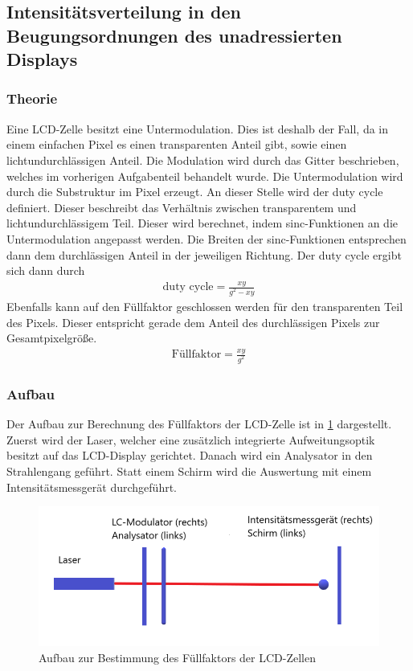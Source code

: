 \subsection{Intensitätsverteilung in den Beugungsordnungen des unadressierten Displays}
\subsubsection{Theorie}
Eine LCD-Zelle besitzt eine Untermodulation. Dies ist deshalb der Fall, da in einem einfachen Pixel es einen transparenten Anteil gibt, sowie einen lichtundurchlässigen Anteil. Die Modulation wird durch das Gitter beschrieben, welches im vorherigen Aufgabenteil behandelt wurde. Die Untermodulation wird durch die Substruktur im Pixel erzeugt. An dieser Stelle wird der duty cycle definiert. Dieser beschreibt das Verhältnis zwischen transparentem und lichtundurchlässigem Teil. 
Dieser wird berechnet, indem sinc-Funktionen an die Untermodulation angepasst werden. Die Breiten der sinc-Funktionen entsprechen dann dem durchlässigen Anteil in der jeweiligen Richtung. 
Der duty cycle ergibt sich dann durch
\begin{align}
	\text{duty cycle} = \frac{xy}{g^{2}-xy}
	\label{dutycyc}
\end{align}
Ebenfalls kann auf den Füllfaktor geschlossen werden für den transparenten Teil des Pixels. Dieser entspricht gerade dem Anteil des durchlässigen Pixels zur Gesamtpixelgröße.
\begin{align}
	\text{Füllfaktor} = \frac{xy}{g^{2}}
	\label{ff}
\end{align}

\subsubsection{Aufbau}
Der Aufbau zur Berechnung des Füllfaktors der LCD-Zelle ist in \cref{422} dargestellt. Zuerst wird der Laser, welcher eine zusätzlich integrierte Aufweitungsoptik besitzt auf das LCD-Display gerichtet. Danach wird ein Analysator in den Strahlengang geführt. Statt einem Schirm wird die Auswertung mit einem Intensitätsmessgerät durchgeführt.
\begin{figure}[h!]
	\centering
	\includegraphics[scale = 1]{4.2.2-Aufbau.png}
	\caption{Aufbau zur Bestimmung des Füllfaktors der LCD-Zellen}
	\label{422}
\end{figure}

